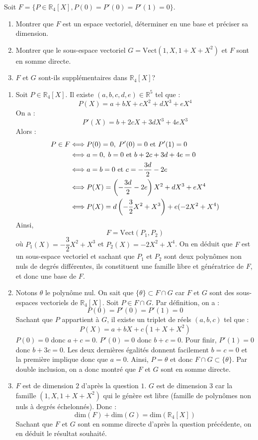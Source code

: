 \documentclass[a4paper,twoside,french,11pt]{VcCours}
\begin{document}
\begin{Exercice}{} Soit $F = \lbrace P \in \mathbb{R}_4[X], P(0)=P'(0)=P'(1)=0 \rbrace$.

\begin{enumerate}
\item Montrer que $F$ est un espace vectoriel, déterminer en une base et préciser sa dimension.
\item Montrer que le sous-espace vectoriel $G= \textrm{Vect}(1,X,1+X+X^2)$ et $F$  sont en somme directe.
\item $F$ et $G$ sont-ils supplémentaires dans $\mathbb{R}_4[X]$?
\end{enumerate}
\end{Exercice}

\corr 

\begin{enumerate}
\item Soit $P \in \mathbb{R}_4[X]$. Il existe $(a,b,c,d,e) \in \mathbb{R}^5$ tel que :
$$ P(X) = a+bX+cX^2+dX^3+eX^4$$
On a :
$$ P'(X) = b+2cX+3dX^3+4eX^3$$
Alors :
\begin{align*}
P \in F & \Longleftrightarrow P(0)=0, \; P'(0)=0 \hbox{ et } P'(1)=0 \\
& \Longleftrightarrow a=0, \; b=0 \hbox{ et } b+2c+3d+4e = 0 \\
& \Longleftrightarrow a=b=0 \hbox{ et } c= -\dfrac{3d}{2} - 2e \\
& \Longleftrightarrow P(X) = \left( -\dfrac{3d}{2} - 2e \right)X^2 + d X^3 + eX^4 \\
& \Longleftrightarrow P(X) = d \left( - \dfrac{3}{2}X^2+ X^3 \right) + e (-2X^2+X^4)
\end{align*}
Ainsi,
$$ F= \textrm{Vect}(P_1,P_2)$$
où $P_1(X) = - \dfrac{3}{2}X^2+ X^3$ et $P_2(X)= -2X^2+X^4$. On en déduit que $F$ est un sous-espace vectoriel et sachant que $P_1$ et $P_2$ sont deux polynômes non nuls de degrés différentes, ils constituent une famille libre et génératrice de $F$, et donc une base de $F$.
\item Notons $\theta$ le polynôme nul. On sait que $\lbrace \theta \rbrace \subset F \cap G$ car $F$ et $G$ sont des sous-espaces vectoriels de $\mathbb{R}_4[X]$. Soit $P \in F \cap G$. Par définition, on a :
$$ P(0)=P'(0)=P'(1)=0$$
Sachant que $P$ appartient à $G$, il existe un triplet de réels $(a,b,c)$ tel que :
$$ P(X)= a + bX + c(1+X+X^2)$$
$P(0)=0$ donc $a+c=0$. $P'(0)=0$ donc $b+c=0$. Pour finir, $P'(1)=0$ donc $b+3c=0$. Les deux dernières égalités donnent facilement $b=c=0$ et la première implique donc que $a=0$. Ainsi, $P= \theta$ et donc $ F \cap G \subset \lbrace \theta \rbrace$. Par double inclusion, on a donc montré que $F$ et $G$ sont en somme directe.
\item $F$ est de dimension $2$ d'après la question $1$. $G$ est de dimension $3$ car la famille $(1,X,1+X+X^2)$ qui le génère est libre (famille de polynômes non nuls à degrés échelonnés). Donc :
$$ \textrm{dim}(F)+ \textrm{dim}(G) = \textrm{dim}(\mathbb{R}_4[X])$$
Sachant que $F$ et $G$ sont en somme directe d'après la question précédente, on en déduit le résultat souhaité.
\end{enumerate}
\end{document}
